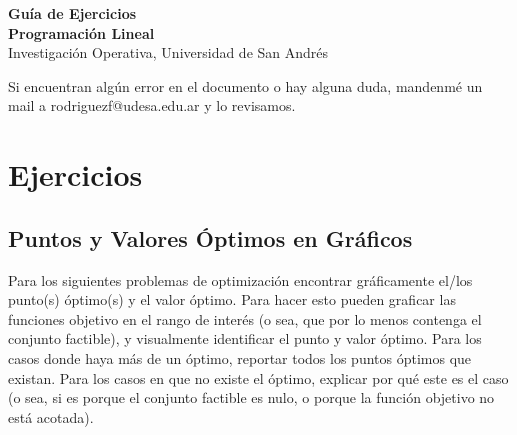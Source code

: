 \documentclass[12pt]{article}
\begin{document}
\begin{center}
    {\LARGE \textbf{Guía de Ejercicios \\Programación Lineal}}\\[0.5em]
    {Investigación Operativa, Universidad de San Andrés}
\end{center}

Si encuentran algún error en el documento o hay alguna duda, mandenmé un mail a rodriguezf@udesa.edu.ar y lo revisamos.

\section{Ejercicios}

\subsection{Puntos y Valores Óptimos en Gráficos}
Para los siguientes problemas de optimización encontrar gráficamente el/los punto(s) óptimo(s) y el valor óptimo. Para hacer esto pueden graficar las funciones objetivo en el rango de interés (o sea, que por lo menos contenga el conjunto factible), y visualmente identificar el punto y valor óptimo. Para los casos donde haya más de un óptimo, reportar todos los puntos óptimos que existan. Para los casos en que no existe el óptimo, explicar por qué este es el caso (o sea, si es porque el conjunto factible es nulo, o porque la función objetivo no está acotada).
\end{document}
